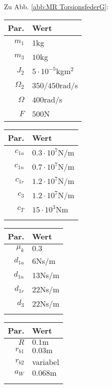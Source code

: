 Zu Abb. \ref{abb:MR TorsionsfederG}:
\begin{center}
\begin{tabular}{r|l}
Par. &Wert\\\hline
$m_1$&$1$kg\\
$m_3$&$10$kg\\
$J_2$& $5\cdot10^{-5}$kgm$^2$ \\
$\Omega_2$&$350$/$450$rad/s\\
$\Omega$&$400$rad/s\\
$F$&$500$N\\
\end{tabular} \hfill
\begin{tabular}{r|l}
Par. &Wert\\\hline
$c_{1a}$&$0.3\cdot10^{7}$N/m\\
$c_{1n}$&$0.7\cdot10^{7}$N/m \\
$c_{1r}$ & $1.2\cdot10^{7}$N/m\\
$c_{3}$ & $1.2\cdot10^{7}$N/m\\
$c_{T}$ & $15\cdot10^{3}$Nm\\
&
\end{tabular} \hfill
\begin{tabular}{r|l}
Par. &Wert\\\hline
$\mu_k$& $0.3$\\
$d_{1a}$&$6$Ns/m\\
$d_{1n}$&$13$Ns/m \\
$d_{1r}$ &$22$Ns/m\\
$d_{3}$ & $22$Ns/m\\
&
\end{tabular} \hfill
\begin{tabular}{r|l}
Par. &Wert\\\hline
$R$&$0.1\textrm{m}$ \\
$r_{b1}$&$ 0.03\textrm{m}$\\
$r_{b2}$& variabel\\
$a_{W}$&$ 0.068\textrm{m}$\\
&\\
&
\end{tabular}
\end{center}


